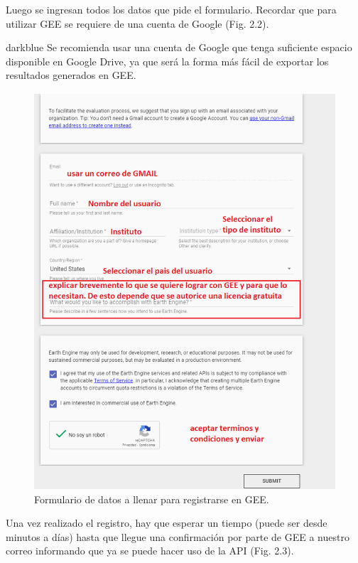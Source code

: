 \documentclass[
  12pt,
  letterpaper,
  twoside]{book}
\begin{document}
Luego se ingresan todos los datos que pide el formulario. Recordar que para utilizar GEE se requiere de una cuenta de Google (Fig. 2.2).

\begin{bluebox2}

\begin{awesomeblock}{5pt}{\faLightbulb}{darkblue}
Se recomienda usar una cuenta de Google que tenga suficiente espacio disponible en Google Drive, ya que será la forma más fácil de exportar los resultados generados en GEE.

\end{awesomeblock}

\end{bluebox2}

\begin{figure}[btp]

{\centering \includegraphics[width=0.6\linewidth]{Img/formulario} 

}

\caption{Formulario de datos a llenar para registrarse en GEE.}\label{fig:unnamed-chunk-3}
\end{figure}

Una vez realizado el registro, hay que esperar un tiempo (puede ser desde minutos a días) hasta que llegue una confirmación por parte de GEE a nuestro correo informando que ya se puede hacer uso de la API (Fig. 2.3).
\end{document}
